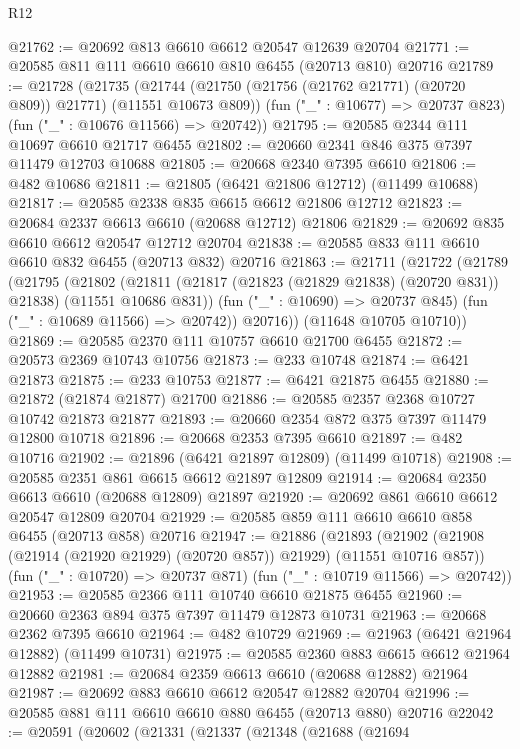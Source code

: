 \begin{lexlean}{R12}
\begin{coremodule}
{{{{{{{{{{{{{{{{{{{{{{{{{{{{{{{{{{{{{{{{{{{{{{{{{{{{{{{{{{{{{{{{{{{{{{{{{{{{{{{{{{@21762 := @20692 @813 @6610 @6612 @20547 @12639 @20704
@21771 := @20585 @811 @111 @6610 @6610 @810 @6455 (@20713 @810) @20716
@21789 := @21728
    (@21735
      (@21744 (@21750 (@21756 (@21762 @21771) (@20720 @809)) @21771) (@11551 @10673 @809))
      (fun ("_" : @10677) => @20737 @823)
      (fun ("_" : @10676 @11566) => @20742))
@21795 := @20585 @2344 @111 @10697 @6610 @21717 @6455
@21802 := @20660 @2341 @846 @375 @7397 @11479 @12703 @10688
@21805 := @20668 @2340 @7395 @6610
@21806 := @482 @10686
@21811 := @21805 (@6421 @21806 @12712) (@11499 @10688)
@21817 := @20585 @2338 @835 @6615 @6612 @21806 @12712
@21823 := @20684 @2337 @6613 @6610 (@20688 @12712) @21806
@21829 := @20692 @835 @6610 @6612 @20547 @12712 @20704
@21838 := @20585 @833 @111 @6610 @6610 @832 @6455 (@20713 @832) @20716
@21863 := @21711
    (@21722
      (@21789
        (@21795
          (@21802
            (@21811 (@21817 (@21823 (@21829 @21838) (@20720 @831)) @21838) (@11551 @10686 @831))
            (fun ("_" : @10690) => @20737 @845)
            (fun ("_" : @10689 @11566) => @20742))
          @20716))
      (@11648 @10705 @10710))
@21869 := @20585 @2370 @111 @10757 @6610 @21700 @6455
@21872 := @20573 @2369 @10743 @10756
@21873 := @233 @10748
@21874 := @6421 @21873
@21875 := @233 @10753
@21877 := @6421 @21875 @6455
@21880 := @21872 (@21874 @21877) @21700
@21886 := @20585 @2357 @2368 @10727 @10742 @21873 @21877
@21893 := @20660 @2354 @872 @375 @7397 @11479 @12800 @10718
@21896 := @20668 @2353 @7395 @6610
@21897 := @482 @10716
@21902 := @21896 (@6421 @21897 @12809) (@11499 @10718)
@21908 := @20585 @2351 @861 @6615 @6612 @21897 @12809
@21914 := @20684 @2350 @6613 @6610 (@20688 @12809) @21897
@21920 := @20692 @861 @6610 @6612 @20547 @12809 @20704
@21929 := @20585 @859 @111 @6610 @6610 @858 @6455 (@20713 @858) @20716
@21947 := @21886
    (@21893
      (@21902 (@21908 (@21914 (@21920 @21929) (@20720 @857)) @21929) (@11551 @10716 @857))
      (fun ("_" : @10720) => @20737 @871)
      (fun ("_" : @10719 @11566) => @20742))
@21953 := @20585 @2366 @111 @10740 @6610 @21875 @6455
@21960 := @20660 @2363 @894 @375 @7397 @11479 @12873 @10731
@21963 := @20668 @2362 @7395 @6610
@21964 := @482 @10729
@21969 := @21963 (@6421 @21964 @12882) (@11499 @10731)
@21975 := @20585 @2360 @883 @6615 @6612 @21964 @12882
@21981 := @20684 @2359 @6613 @6610 (@20688 @12882) @21964
@21987 := @20692 @883 @6610 @6612 @20547 @12882 @20704
@21996 := @20585 @881 @111 @6610 @6610 @880 @6455 (@20713 @880) @20716
@22042 := @20591
    (@20602
      (@21331
        (@21337
          (@21348
            (@21688
              (@21694
}}}}}}}}}}}}}}}}}}}}}}}}}}}}}}}}}}}}}}}}}}}}}}}}}}}}}}}}}}}}}}}}}}}}}}}}}}}}}}}}}}
\end{coremodule}
\end{lexlean}
